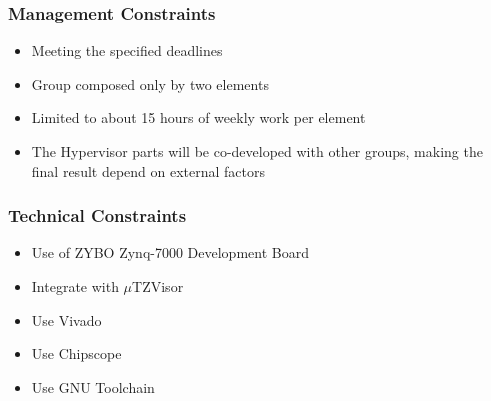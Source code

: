 \subsubsection{Management Constraints}
\begin{itemize}  
	\item Meeting the specified deadlines
	\item Group composed only by two elements
	\item Limited to about 15 hours of weekly work per element
	\item The Hypervisor parts will be co-developed with other groups, making the final result depend on external factors
\end{itemize}

\subsubsection{Technical Constraints}
\begin{itemize}
	\item Use of ZYBO Zynq-7000 Development Board
	\item Integrate with \(\mu\)TZVisor
	\item Use Vivado
	\item Use Chipscope
	\item Use GNU Toolchain
\end{itemize}